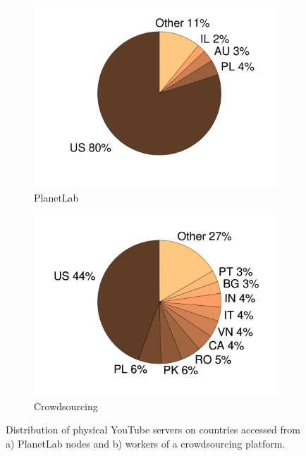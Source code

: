 \begin{figure}[bt]
    \centering
	\begin{subfigure}[t]{0.49\textwidth}
	\includegraphics[width=\textwidth]{aslevel/crowd/figs/PLDest.pdf}
  \caption{PlanetLab}
	\label{fig:PLDst}
  \end{subfigure}
	\begin{subfigure}[t]{0.49\textwidth}
	\includegraphics[width=\textwidth]{aslevel/crowd/figs/MWDest.pdf}
  \caption{Crowdsourcing}
 	\label{fig:MWDst}
  \end{subfigure}
    \caption{Distribution of physical YouTube servers on countries accessed from a) PlanetLab nodes and b) workers of a crowdsourcing platform.}
    \label{fig:Dst}
\end{figure}

